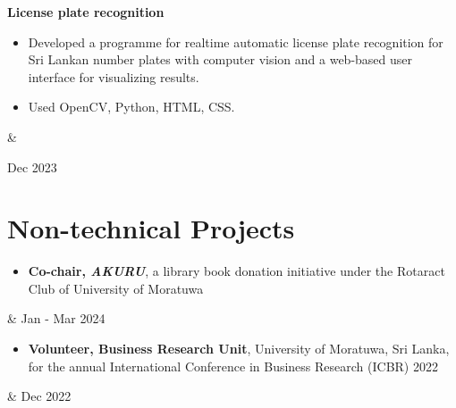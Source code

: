 \documentclass[10pt, a4paper]{article}
\newenvironment{highlights}{
        \begin{itemize}[
                topsep=0pt,
                parsep=0.10 cm,
                partopsep=0pt,
                itemsep=0pt,
                after=\vspace{-1\baselineskip},
                leftmargin=0.4 cm + 3pt
            ]
    }{
        \end{itemize}
    } %
\let\originalTabularx\tabularx
\let\originalEndTabularx\endtabularx
\renewenvironment{tabularx}{\bgroup\centering\originalTabularx}{\originalEndTabularx\par\egroup}
\begin{document}
        \vspace{0.2 cm}
        \begin{tabularx}{
            \textwidth-0.4 cm-0.13cm
        }{
            K{0.2 cm}
            R{4.1 cm}
        }
            \textbf{License plate recognition}

            \vspace{0.10 cm}

            \begin{highlights}
                \item Developed a programme for realtime automatic license plate recognition for Sri Lankan number plates with computer vision and a web-based user interface for visualizing results.
                \item Used OpenCV, Python, HTML, CSS.
            \end{highlights}
            &
            

            Dec 2023
        \end{tabularx}


        \vspace{0.2 cm}
        
        
	\section{Non-technical Projects}
	
	\begin{tabularx}{
            \textwidth-0.4 cm-0.13cm
        }{
            K{0.2 cm}
            R{4.1 cm}
        }
            \begin{highlights}
			\item \textbf{Co-chair, \textit{AKURU}}, a library book donation initiative under the Rotaract Club of University of Moratuwa \end{highlights}
            &
            Jan - Mar 2024
        \end{tabularx}
	\begin{tabularx}{
            \textwidth-0.4 cm-0.13cm
        }{
            K{0.2 cm}
            R{4.1 cm}
        }
            \begin{highlights}
			\item \textbf{Volunteer, Business Research Unit}, University of Moratuwa, Sri Lanka, for the annual International Conference in Business Research (ICBR) 2022 \end{highlights}
            &
            Dec 2022
        \end{tabularx}
\end{document}
